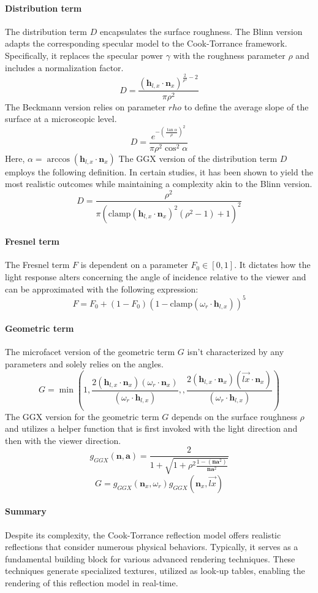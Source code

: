 \paragraph*{Distribution term}
The distribution term $D$ encapsulates the surface roughness. 
The Blinn version adapts the corresponding specular model to the Cook-Torrance framework. 
Specifically, it replaces the specular power $\gamma$ with the roughness parameter $\rho$ and includes a normalization factor.
\[D=\dfrac{(\mathbf{h}_{l,x}\cdot\mathbf{n}_x)^{\frac{2}{\rho^2}-2}}{\pi\rho^2}\]
The Beckmann version relies on parameter $rho$ to define the average slope of the surface at a microscopic level.
\[D=\dfrac{e^{-\left(\frac{\tan\alpha}{\rho}\right)^2}}{\pi\rho^2\cos^2\alpha}\]
Here, $\alpha=\arccos(\mathbf{h}_{l,x}\cdot\mathbf{n}_x)$
The GGX version of the distribution term $D$ employs the following definition. 
In certain studies, it has been shown to yield the most realistic outcomes while maintaining a complexity akin to the Blinn version.
\[D=\dfrac{\rho^2}{\pi(\text{clamp}(\mathbf{h}_{l,x}\cdot\mathbf{n}_x)^2(\rho^2-1)+1)^2}\]

\paragraph*{Fresnel term}
The Fresnel term $F$ is dependent on a parameter $F_0 \in [0,1]$. 
It dictates how the light response alters concerning the angle of incidence relative to the viewer and can be approximated with the following expression:
\[F=F_0+(1-F_0)\left(1-\text{clamp}(\omega_r\cdot\mathbf{h}_{l,x})\right)^5\]

\paragraph*{Geometric term}
The microfacet version of the geometric term $G$ isn't characterized by any parameters and solely relies on the angles.
\[G=\min\left(1,\dfrac{2(\mathbf{h}_{l,x}\cdot\mathbf{n}_x)(\omega_r\cdot\mathbf{n}_x)}{(\omega_r\cdot\mathbf{h}_{l,x})},,\dfrac{2(\mathbf{h}_{l,x}\cdot\mathbf{n}_x)(\overrightarrow{lx}\cdot\mathbf{n}_x)}{(\omega_r\cdot\mathbf{h}_{l,x})}\right)\]
The GGX version for the geometric term $G$ depends on the surface roughness $\rho$ and utilizes a helper function that is first invoked with the light direction and then with the viewer direction.
\[g_{GGX}(\mathbf{n},\mathbf{a})=\dfrac{2}{1+\sqrt{1+\rho^2\frac{1-(\mathbf{na}^2)}{\mathbf{na}^2}}}\]
\[G=g_{GGX}(\mathbf{n}_x,\omega_r)g_{GGX}(\mathbf{n}_x,\overrightarrow{lx})\]

\paragraph*{Summary}
Despite its complexity, the Cook-Torrance reflection model offers realistic reflections that consider numerous physical behaviors. 
Typically, it serves as a fundamental building block for various advanced rendering techniques. 
These techniques generate specialized textures, utilized as look-up tables, enabling the rendering of this reflection model in real-time.